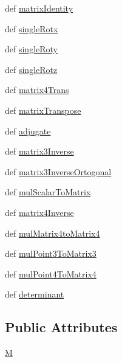 \begin{DoxyCompactItemize}
\item 
def \hyperlink{classlib_1_1_geo_math_1_1_matrix_aa10beed967ffe764f8a26990337f79e9}{matrix\-Identity}
\item 
def \hyperlink{classlib_1_1_geo_math_1_1_matrix_a89d5a575d10013ab8cbb52c7ddba0538}{single\-Rotx}
\item 
def \hyperlink{classlib_1_1_geo_math_1_1_matrix_a7c8e2715adb8cddc87d5bce4fac89d6d}{single\-Roty}
\item 
def \hyperlink{classlib_1_1_geo_math_1_1_matrix_a1fe3bf8321a00b34489b0fdf0124a25d}{single\-Rotz}
\item 
def \hyperlink{classlib_1_1_geo_math_1_1_matrix_a750c3b2d4b3ffdbd0a08438664497d65}{matrix4\-Trans}
\item 
def \hyperlink{classlib_1_1_geo_math_1_1_matrix_a36a7a1b6d607466c1070d4ffb12d0a49}{matrix\-Transpose}
\item 
def \hyperlink{classlib_1_1_geo_math_1_1_matrix_abd93f7d2dcabc6bde14377159703883c}{adjugate}
\item 
def \hyperlink{classlib_1_1_geo_math_1_1_matrix_a649ae316f381f657620a90a2b3d13d6e}{matrix3\-Inverse}
\item 
def \hyperlink{classlib_1_1_geo_math_1_1_matrix_a07a496b479edfc6ea1773cdd8cbe56e1}{matrix3\-Inverse\-Ortogonal}
\item 
def \hyperlink{classlib_1_1_geo_math_1_1_matrix_a7f5a2851e3cb43215844fc087c291450}{mul\-Scalar\-To\-Matrix}
\item 
def \hyperlink{classlib_1_1_geo_math_1_1_matrix_a4a62b13ec2d2e3e7e7384a1f99d6e625}{matrix4\-Inverse}
\item 
def \hyperlink{classlib_1_1_geo_math_1_1_matrix_a67a645ec4527b8c99049460c792b1e74}{mul\-Matrix4to\-Matrix4}
\item 
def \hyperlink{classlib_1_1_geo_math_1_1_matrix_a0e808dadc25a5f1c39f8df29ad3e2268}{mul\-Point3\-To\-Matrix3}
\item 
def \hyperlink{classlib_1_1_geo_math_1_1_matrix_ade3fba5f3c74a1eb56ee1a9bb5e48502}{mul\-Point4\-To\-Matrix4}
\item 
def \hyperlink{classlib_1_1_geo_math_1_1_matrix_ae1b197a0fb641aa1052c16cf4fd68033}{determinant}
\end{DoxyCompactItemize}
\subsection*{Public Attributes}
\begin{DoxyCompactItemize}
\item 
\hyperlink{classlib_1_1_geo_math_1_1_matrix_a1255df8bb9b9d8b80eaa32021a979b39}{M}
\end{DoxyCompactItemize}


